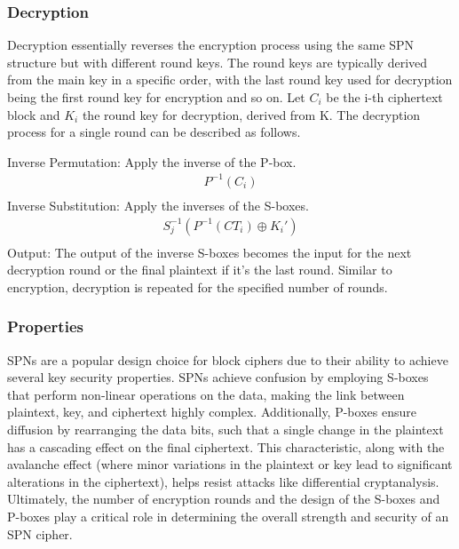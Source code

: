 \documentclass[conference]{IEEEtran}
\begin{document}
\subsubsection{Decryption}

Decryption essentially reverses the encryption process using the same SPN structure but with different round keys. The round keys are typically derived from the main key in a specific order, with the last round key used for decryption being the first round key for encryption and so on.
Let $C_i$ be the i-th ciphertext block and $K_i$ the round key for decryption, derived from K. The decryption process for a single round can be described as follows.

Inverse Permutation: Apply the inverse of the P-box.
\begin{align*}
    P^{-1}(C_i) \\
\end{align*}
Inverse Substitution: Apply the inverses of the S-boxes.
\begin{align*}
    S_j^{-1}(P^{-1}(CT_i) \oplus K_i') \\
\end{align*}
Output: The output of the inverse S-boxes becomes the input for the next decryption round or the final plaintext if it's the last round.
Similar to encryption, decryption is repeated for the specified number of rounds.
\subsubsection{Properties}
SPNs are a popular design choice for block ciphers due to their ability to achieve several key security properties.  SPNs achieve confusion by employing S-boxes that perform non-linear operations on the data, making the link between plaintext, key, and ciphertext highly complex. Additionally, P-boxes ensure diffusion by rearranging the data bits, such that a single change in the plaintext has a cascading effect on the final ciphertext. This characteristic, along with the avalanche effect (where minor variations in the plaintext or key lead to significant alterations in the ciphertext), helps resist attacks like differential cryptanalysis. Ultimately, the number of encryption rounds and the design of the S-boxes and P-boxes play a critical role in determining the overall strength and security of an SPN cipher.
\end{document}
